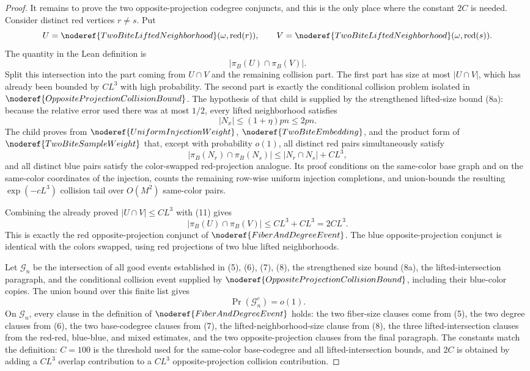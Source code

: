 \begin{proof}
It remains to prove the two opposite-projection codegree conjuncts, and this
is the only place where the constant \(2C\) is needed.  Consider distinct red
vertices \(r\ne s\).  Put
\[
U=\noderef{TwoBiteLiftedNeighborhood}(\omega,\operatorname{red}(r)),
\qquad
V=\noderef{TwoBiteLiftedNeighborhood}(\omega,\operatorname{red}(s)).
\]
The quantity in the Lean definition is
\[
|\pi_B(U)\cap\pi_B(V)|.
\]
Split this intersection into the part coming from \(U\cap V\) and the
remaining collision part.  The first part has size at most \(|U\cap V|\),
which has already been bounded by \(C L^3\) with high probability.  The
second part is exactly the conditional collision problem isolated in
\(\noderef{OppositeProjectionCollisionBound}\).  The hypothesis of that child
is supplied by the strengthened lifted-size bound (8a): because the relative
error used there was at most \(1/2\), every lifted neighborhood
satisfies
\[
|N_x|\le (1+\eta)pn\le 2pn.
\tag{10}
\]
The child proves from \(\noderef{UniformInjectionWeight}\),
\(\noderef{TwoBiteEmbedding}\), and the product form of
\(\noderef{TwoBiteSampleWeight}\) that, except with probability \(o(1)\),
all distinct red pairs simultaneously satisfy
\[
|\pi_B(N_r)\cap\pi_B(N_s)|
\le |N_r\cap N_s|+C L^3,
\tag{11}
\]
and all distinct blue pairs satisfy the color-swapped red-projection
analogue.  Its proof conditions on the same-color base graph and on the
same-color coordinates of the injection, counts the remaining row-wise
uniform injection completions, and union-bounds the resulting
\(\exp(-cL^3)\) collision tail over \(O(M^2)\) same-color pairs.

Combining the already proved \(|U\cap V|\le C L^3\) with (11) gives
\[
|\pi_B(U)\cap\pi_B(V)|
\le C L^3+C L^3=2C L^3.
\]
This is exactly the red opposite-projection conjunct of
\(\noderef{FiberAndDegreeEvent}\).  The blue opposite-projection conjunct is
identical with the colors swapped, using red projections of two blue lifted
neighborhoods.

Let \(\mathcal G_n\) be the intersection of all good events established in
(5), (6), (7), (8), the strengthened size bound (8a), the
lifted-intersection paragraph, and the conditional collision event supplied by
\(\noderef{OppositeProjectionCollisionBound}\), including their blue-color
copies.  The union bound over this finite list gives
\[
\Pr(\mathcal G_n^c)=o(1).
\tag{13}
\]
On \(\mathcal G_n\), every clause in the definition of
\(\noderef{FiberAndDegreeEvent}\) holds: the two fiber-size clauses come from
(5), the two degree clauses from (6), the two base-codegree clauses from (7),
the lifted-neighborhood-size clause from (8), the three lifted-intersection
clauses from the red-red, blue-blue, and mixed estimates, and the two
opposite-projection clauses from the final paragraph.  The constants match
the definition: \(C=100\) is the threshold used for the same-color
base-codegree and all lifted-intersection bounds, and \(2C\) is obtained by
adding a \(C L^3\) overlap contribution to a \(C L^3\) opposite-projection
collision contribution.


\end{proof}
